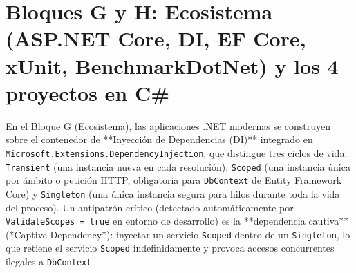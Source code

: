 \documentclass{book}
\begin{document}
\section{Bloques G y H: Ecosistema (ASP.NET Core, DI, EF Core, xUnit, BenchmarkDotNet) y los 4 proyectos en C\#}

En el Bloque G (Ecosistema), las aplicaciones .NET modernas se construyen sobre el contenedor de **Inyección de Dependencias (DI)** integrado en \texttt{Microsoft.Extensions.DependencyInjection}, que distingue tres ciclos de vida: \texttt{Transient} (una instancia nueva en cada resolución), \texttt{Scoped} (una instancia única por ámbito o petición HTTP, obligatoria para \texttt{DbContext} de Entity Framework Core) y \texttt{Singleton} (una única instancia segura para hilos durante toda la vida del proceso). Un antipatrón crítico (detectado automáticamente por \texttt{ValidateScopes = true} en entorno de desarrollo) es la **dependencia cautiva** (*Captive Dependency*): inyectar un servicio \texttt{Scoped} dentro de un \texttt{Singleton}, lo que retiene el servicio \texttt{Scoped} indefinidamente y provoca accesos concurrentes ilegales a \texttt{DbContext}.
\end{document}
